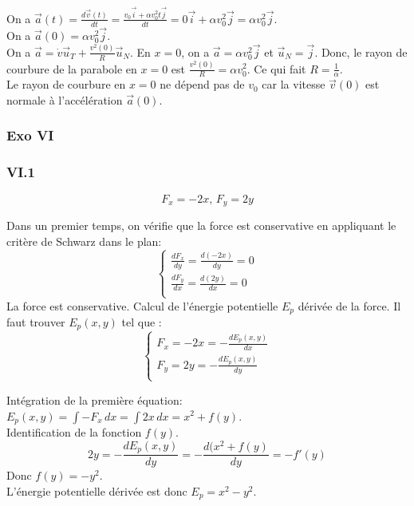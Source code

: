 \documentclass[]{book}
\theoremstyle{definition}
\begin{document}
On a $\vec{a}(t) = \frac{d\vec{v}(t)}{dt} = \frac{v_0\vec{i}+\alpha v_0^2 t \vec{j}}{dt} = 0\vec{i}+\alpha v_0^2\vec{j} = \alpha v_0^2\vec{j}$. \\

On a $\vec{a}(0) = \alpha v_0^2 \vec{j}$.\\

On a $\vec{a} = \dot{v}\vec{u}_T + \frac{v^2(0)}{R}\vec{u}_N$. En $x=0$, on a $\vec{a} = \alpha v_0^2 \vec{j}$ et $\vec{u}_N = \vec{j}$. Donc, le rayon de courbure de la parabole en $x = 0$ est $\frac{v^2(0)}{R} = \alpha v_0^2$. Ce qui fait $R=\frac{1}{\alpha}$. \\

Le rayon de courbure en $x=0$ ne d\'epend pas de $v_0$ car la vitesse $\vec{v}(0)$ est normale \`a l'acc\'el\'eration $\vec{a}(0)$.

\subsubsection*{Exo VI}
\subsubsection*{VI.1}
$$F_x = -2x,\, F_y = 2y$$

Dans un premier temps, on v\'erifie que la force est conservative en appliquant le crit\`ere de Schwarz dans le plan:
$$
\left\{
\begin{array}{l }
	\frac{dF_x}{dy} = \frac{d(-2x)}{dy} = 0\\
	\frac{dF_y}{dx} = \frac{d(2y)}{dx} = 0\\
\end{array}
\right. 
$$
La force est conservative. Calcul de l'\'energie potentielle $E_p$ d\'eriv\'ee de la force. Il faut trouver $E_p(x,y)$ tel que :
$$
\left\{
\begin{array}{l }
	F_x = -2x = -\frac{dE_p(x,y)}{dx} \\
	F_y =  2y = -\frac{dE_p(x,y)}{dy} \\
\end{array}
\right. 
$$

Int\'egration de la premi\`ere \'equation: $E_p(x,y) = \int{-F_x\, dx} = \int{2x\, dx} = x^2 + f(y)$.\\
Identification de la fonction $f(y)$. 
$$2y = -\frac{dE_p(x,y)}{dy} = -\frac{d(x^2+f(y)}{dy} = -f'(y)$$
Donc $f(y) = -y^2$.\\

L'\'energie potentielle d\'eriv\'ee est donc $E_p = x^2 - y^2$.
\end{document}
